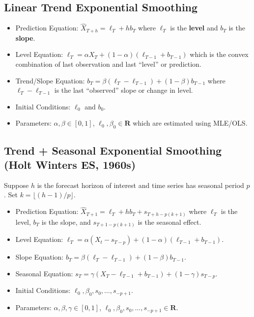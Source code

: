 \subsection*{Linear Trend Exponential Smoothing}
\begin{itemize}
      \item Prediction Equation: $ \hat{X}_{T+h}=\ell_T+h b_T $ where $ \ell_T $
            is the \textbf{level} and $ b_T $ is the \textbf{slope}.
      \item Level Equation: $ \ell_T=\alpha X_T+(1-\alpha)(\ell_{T-1}+b_{T-1}) $
            which is the convex combination of last observation and last ``level''
            or prediction.
      \item Trend/Slope Equation: $ b_T=\beta(\ell_T-\ell_{T-1})+(1-\beta)b_{T-1} $
            where $ \ell_T-\ell_{T-1} $ is the last ``observed'' slope or change in level.
      \item Initial Conditions: $ \ell_0 $ and $ b_0 $.
      \item Parameters: $ \alpha,\beta\in[0,1] $, $ \ell_0,\beta_0\in\mathbf{R} $
            which are estimated using MLE/OLS\@.
\end{itemize}

\subsection*{Trend + Seasonal Exponential Smoothing (Holt Winters ES, 1960s)}
Suppose $ h $ is the forecast horizon of interest and time series has seasonal
period $ p $. Set $ k=\lfloor (h-1)/p\rfloor $.
\begin{itemize}
      \item Prediction Equation: $ \hat{X}_{T+1}=\ell_T+h b_T+s_{T+h-p(k+1)} $
            where $ \ell_T $ is the level, $ b_T $ is the slope, and
            $ s_{T+1-p(k+1)} $ is the seasonal effect.
      \item Level Equation: $ \ell_T=\alpha(X_t-s_{T-p})+(1-\alpha)(\ell_{T-1}+b_{T-1}) $.
      \item Slope Equation: $ b_T=\beta(\ell_T-\ell_{T-1})+(1-\beta)b_{T-1} $.
      \item Seasonal Equation: $ s_T=\gamma(X_T-\ell_{T-1}+b_{T-1})+(1-\gamma)s_{T-p} $.
      \item Initial Conditions: $ \ell_0,\beta_0,s_0,\ldots,s_{-p+1} $.
      \item Parameters: $ \alpha,\beta,\gamma\in[0,1] $, $ \ell_0,\beta_0,s_0,\ldots,s_{-p+1}\in\mathbf{R} $.
\end{itemize}

